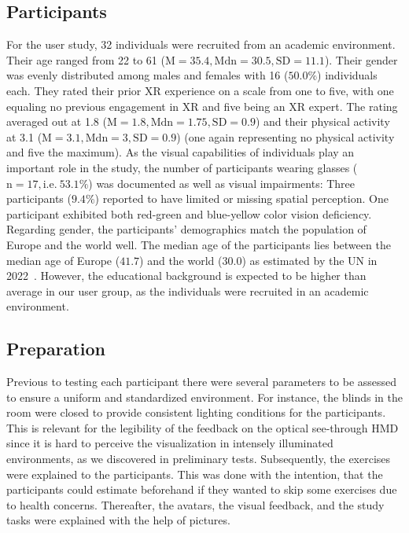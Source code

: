 \subsection{Participants}
For the user study, 32 individuals were recruited from an academic environment. Their age ranged from 22 to 61 (\(\mathrm{M} = 35.4, \mathrm{Mdn} = 30.5, \mathrm{SD} = 11.1\)). Their gender was evenly distributed among males and females with 16 (\(50.0\%\)) individuals each. They rated their prior XR experience on a scale from one to five, with one equaling no previous engagement in XR and five being an XR expert. The rating averaged out at 1.8 (\(\mathrm{M}=1.8, \mathrm{Mdn} = 1.75, \mathrm{SD} = 0.9\)) and their physical activity at 3.1 (\(\mathrm{M}=3.1, \mathrm{Mdn} = 3, \mathrm{SD} = 0.9\)) (one again representing no physical activity and five the maximum). As the visual capabilities of individuals play an important role in the study, the number of participants wearing glasses (\(\mathrm{n} = 17, \mathrm{i.e.}~53.1\%\)) was documented as well as visual impairments: Three participants (\(9.4\%\)) reported to have limited or missing spatial perception. One participant exhibited both red-green and blue-yellow color vision deficiency. Regarding gender, the participants' demographics match the population of Europe and the world well. The median age of the participants lies between the median age of Europe (\(41.7\)) and the world (\(30.0\)) as estimated by the UN in 2022~\cite{united2022world}. However, the educational background is expected to be higher than average in our user group, as the individuals were recruited in an academic environment.

\subsection{Preparation}
Previous to testing each participant there were several parameters to be assessed to ensure a uniform and standardized environment. For instance, the blinds in the room were closed to provide consistent lighting conditions for the participants. This is relevant for the legibility of the feedback on the optical see-through HMD since it is hard to perceive the visualization in intensely illuminated environments, as we discovered in preliminary tests. Subsequently, the exercises were explained to the participants. This was done with the intention, that the participants could estimate beforehand if they wanted to skip some exercises due to health concerns. Thereafter, the avatars, the visual feedback, and the study tasks were explained with the help of pictures.

